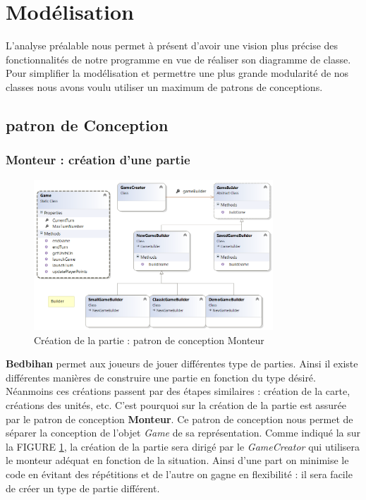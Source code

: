 \section{Modélisation}

	L'analyse préalable nous permet à présent d'avoir une vision plus précise des fonctionnalités de notre programme en vue de réaliser son diagramme de classe. Pour simplifier la modélisation et permettre une plus grande modularité de nos classes nous avons voulu utiliser un maximum de patrons de conceptions. 

	\subsection{patron de Conception}

		\subsubsection{Monteur : création d'une partie}

				\begin{figure}[h]
		\begin{center}
			\includegraphics[width=0.8\textwidth]{figure/builder.png}
		\end{center}
		\caption{Création de la partie : patron de conception Monteur}
		\label{fig:builder}
	\end{figure}

		\textbf{Bedbihan} permet aux joueurs de jouer différentes type de parties. Ainsi il existe différentes manières de construire une partie en fonction du type désiré. Néanmoins ces créations passent par des étapes similaires : création de la carte, créations des unités, etc. C'est pourquoi sur  la création de la partie est assurée par le patron de conception \textbf{Monteur}. Ce patron de conception nous permet de séparer la conception de l'objet \emph{Game} de sa représentation. Comme indiqué la sur la FIGURE \ref{fig:builder}, la création de la partie sera dirigé par le \emph{GameCreator} qui utilisera le monteur adéquat en fonction de la situation. Ainsi d'une part on minimise le code en évitant des répétitions et de l'autre on gagne en flexibilité : il sera facile de créer un type de partie différent. 



